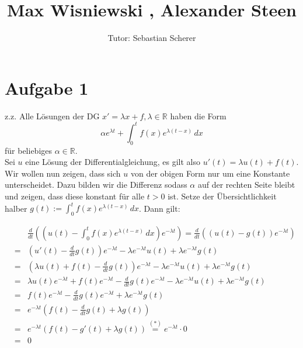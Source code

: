\documentclass[11pt,a4paper,ngerman]{article}
\author{Tutor: Sebastian Scherer}
\date{}
\title{Max Wisniewski , Alexander Steen}
\begin{document}

\maketitle
\thispagestyle{fancy}



\section*{Aufgabe 1}
z.z. Alle Lösungen der DG $x' = \lambda x + f, \lambda \in \mathbb{R}$ haben die Form
$$ \alpha e^{\lambda t} + \int_0^t f(x)e^{\lambda (t-x)} \, dx  $$
für beliebiges $\alpha \in \mathbb{R}$. \\

Sei $u$ eine Lösung der Differentialgleichung, es gilt also $u'(t) = \lambda u(t) + f(t)$. Wir wollen nun zeigen, dass sich $u$ von der obigen Form nur um eine Konstante unterscheidet. Dazu bilden wir die Differenz sodass $\alpha$ auf der rechten Seite bleibt und zeigen, dass diese konstant für alle $t > 0$ ist.
Setze der Übersichtlichkeit halber $g(t) := \int_0^t f(x)e^{\lambda (t-x)} \, dx$. Dann gilt:

\begin{eqnarray*}
& & \frac{d}{dt} \left( \left( u(t) - \int_0^t f(x)e^{\lambda (t-x)} \, dx \right) e^{-\lambda t} \right)
= \frac{d}{dt} \left( (u(t) - g(t)) e^{-\lambda t} \right) \\
&=& \left( u'(t) - \frac{d}{dt} g(t) \right) e^{-\lambda t} - \lambda e^{-\lambda t} u(t) + \lambda e^{-\lambda t} g(t) \\
&=& \left( \lambda u(t) + f(t) - \frac{d}{dt} g(t) \right) e^{-\lambda t} - \lambda e^{-\lambda t} u(t) + \lambda e^{-\lambda t} g(t) \\
&=& \lambda u(t) e^{-\lambda t} + f(t)e^{-\lambda t} - \frac{d}{dt} g(t) e^{-\lambda t} - \lambda e^{-\lambda t} u(t) + \lambda e^{-\lambda t} g(t) \\
&=& f(t)e^{-\lambda t} - \frac{d}{dt} g(t) e^{-\lambda t} + \lambda e^{-\lambda t} g(t) \\
&=& e^{-\lambda t} \left( f(t) - \frac{d}{dt} g(t) + \lambda g(t) \right) \\
&=& e^{-\lambda t} \left( f(t) - g'(t) + \lambda g(t) \right) \stackrel{(*)}{=}  e^{-\lambda t} \cdot 0\\
&=& 0
\end{eqnarray*}
\end{document}
